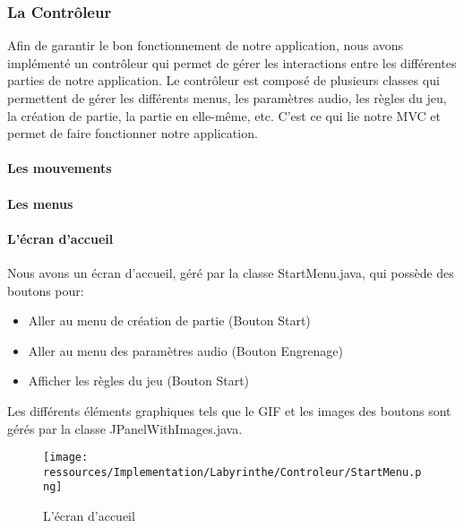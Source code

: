\subsubsection{La Contrôleur}
\label{subsubsec:controleur}

Afin de garantir le bon fonctionnement de notre application, nous avons implémenté un contrôleur qui permet de gérer les interactions entre les différentes parties de notre application. Le contrôleur est composé de plusieurs classes qui permettent de gérer les différents menus, les paramètres audio, les règles du jeu, la création de partie, la partie en elle-même, etc. C'est ce qui lie notre MVC et permet de faire fonctionner notre application.

\paragraph{Les mouvements}


\paragraph{Les menus}

\paragraph{L'écran d'accueil}

Nous avons un écran d'accueil, géré par la classe StartMenu.java, qui possède des boutons pour:

\begin{itemize}
    \item Aller au menu de création de partie (Bouton Start)
    \item Aller au menu des paramètres audio (Bouton Engrenage)
    \item Afficher les règles du jeu (Bouton Start)
\end{itemize}

Les différents éléments graphiques tels que le GIF et les images des boutons sont gérés par la classe JPanelWithImages.java.

\begin{figure}[h!]
    \centering
    \texttt{[image: ressources/Implementation/Labyrinthe/Controleur/StartMenu.png]}%
    \caption{L'écran d'accueil}
    \label{fig:StartMenu}
\end{figure}

